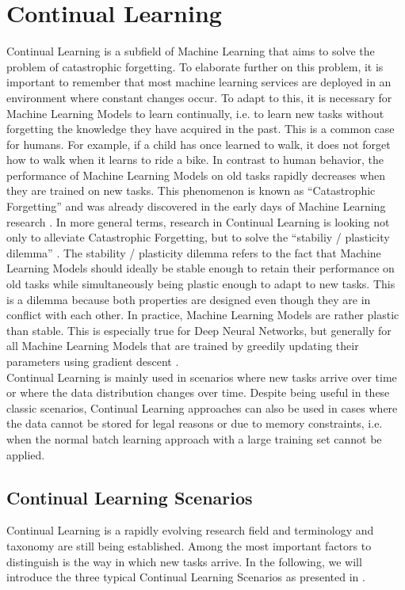 \section{Continual Learning}
\label{sec:ContinualLearning}
Continual Learning is a subfield of Machine Learning that aims to solve the problem of catastrophic forgetting. To elaborate further on this problem,
it is important to remember that most machine learning services are deployed in an environment where constant changes occur. To adapt to this, it is
necessary for Machine Learning Models to learn continually, i.e. to learn new tasks without forgetting the knowledge they have acquired in the past.
This is a common case for humans. For example, if a child has once learned to walk, it does not forget how to walk when it learns to ride a bike.
In contrast to human behavior, the performance of Machine Learning Models on old tasks rapidly decreases when they are trained on new tasks. This phenomenon
is known as \enquote{Catastrophic Forgetting} and was already discovered in the early days of Machine Learning research \cite{mccloskey1989catastrophic}.
In more general terms, research in Continual Learning is looking not only to alleviate Catastrophic Forgetting, but to solve the 
\enquote{stabiliy / plasticity dilemma} \cite{carpenter1988art}. The stability / plasticity dilemma refers to the fact that Machine Learning Models
should ideally be stable enough to retain their performance on old tasks while simultaneously being plastic enough to adapt to new tasks. This is a dilemma
because both properties are designed even though they are in conflict with each other. In practice, Machine Learning Models are rather plastic than stable.
This is especially true for Deep Neural Networks, but generally for all Machine Learning Models that are trained by greedily updating their parameters using
gradient descent \cite{mundt2020wholistic}. \\
Continual Learning is mainly used in scenarios where new tasks arrive over time or where the data distribution changes over time. Despite being useful
in these classic scenarios, Continual Learning approaches can also be used in cases where the data cannot be stored for legal reasons or due to memory
constraints, i.e. when the normal batch learning approach with a large training set cannot be applied. 


\subsection{Continual Learning Scenarios}
\label{sec:ContinualLearningScenarios}
Continual Learning is a rapidly evolving research field and terminology and taxonomy are still being established. Among the most important factors to distinguish
is the way in which new tasks arrive. In the following, we will introduce the three typical Continual Learning Scenarios as presented in \cite{van2022three}. 


